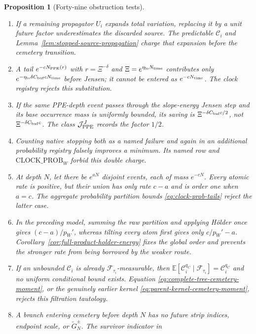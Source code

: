 \documentclass[11pt]{article}
\newtheorem{proposition}[theorem]{Proposition}
\begin{document}
\begin{proposition}[Forty-nine obstruction tests]
\begin{enumerate}[label=\textup{(T\arabic*)}]
      rejects the missing envelope.
\item If a remaining propagator $U_i$ expands total variation, replacing it
      by a unit future factor underestimates the discarded source.  The
      predictable $\mathcal C_i$ and
      Lemma~\ref{lem:stopped-source-propagation} charge that expansion before
      the cemetery transition.
\item A tail $e^{-cN_{\rm PPE}(r)}$ with $r=\Xi^{-\delta}$ and
      $\Xi=e^{\eta_{\rm lo}N_{\rm time}}$ contributes only
      $e^{-\eta_{\rm lo}\delta C_{\rm buf}cN_{\rm time}}$ before Jensen; it
      cannot be entered as $e^{-cN_{\rm time}}$.  The clock registry rejects
      this substitution.
\item If the same PPE-depth event passes through the slope-energy Jensen
      step and its base occurrence mass is uniformly bounded, its saving is
      $\Xi^{-\delta C_{\rm buf}c/2}$, not
      $\Xi^{-\delta C_{\rm buf}c}$.  The class
      $\mathcal J_{\rm PPE}^{J}$ records the factor $1/2$.
\item Counting native stopping both as a named failure and again in an
      additional probability registry falsely improves a minimum.  Its
      named row and \(\mathrm{CLOCK\_PROB}_{W}\) forbid this double charge.
\item At depth $N$, let there be $e^{aN}$ disjoint events, each of mass
      $e^{-cN}$.  Every atomic rate is positive, but their union has only
      rate $c-a$ and is order one when $a=c$.  The aggregate probability
      partition bounds \eqref{eq:clock-prob-tails} reject the latter case.
\item In the preceding model, summing the raw partition and applying
      H\"older once gives $(c-a)/p_W'$, whereas tilting every atom first gives
      only $c/p_W'-a$.  Corollary~\ref{cor:full-product-holder-energy}
      fixes the global order and prevents the stronger rate from being
      borrowed by the weaker route.
\item If an unbounded $\mathcal C_i$ is already
      $\mathcal F_{\tau_i}$-measurable, then
      $\mathbb E[\mathcal C_i^{q_C}\mid\mathcal F_{\tau_i}]
      =\mathcal C_i^{q_C}$ and no uniform conditional bound exists.
      Equation \eqref{eq:complete-tree-cemetery-moment}, or the genuinely
      earlier kernel \eqref{eq:parent-kernel-cemetery-moment}, rejects this
      filtration tautology.
\item A branch entering cemetery before depth $N$ has no future strip indices,
      endpoint scale, or $\widetilde G_N^\pm$.  The survivor indicator in

\end{enumerate}
\end{proposition}
\end{document}
